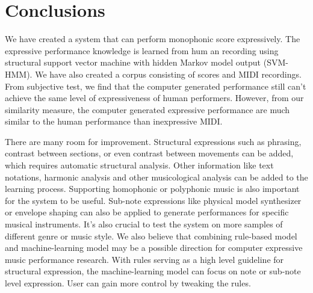 \chapter{Conclusions}
We have created a system that can perform monophonic score expressively. The expressive performance knowledge is learned from hum an recording using structural support vector machine with hidden Markov model output (SVM-HMM). We have also created a corpus consisting of scores and MIDI recordings.  From subjective test, we find that the computer generated performance still can't achieve the same level of expressiveness of human performers. However, from our similarity measure, the computer generated expressive performance are much similar to the human performance than inexpressive MIDI. %

There are many room for improvement. Structural expressions such as phrasing, contrast between sections, or even contrast between movements can be added, which requires automatic structural analysis. Other information like text notations, harmonic analysis and other musicological analysis can be added to the learning process. Supporting homophonic or polyphonic music is also important for the system to be useful. Sub-note expressions like physical model synthesizer or envelope shaping can also be applied to generate performances for specific musical instruments. It's also crucial to test the system on more samples of different genre or music style. We also believe that combining rule-based model and machine-learning model may be a possible direction for computer expressive music performance research. With rules serving as a high level guideline for structural expression, the machine-learning model can focus on note or sub-note level expression. User can gain more control by tweaking the rules.


